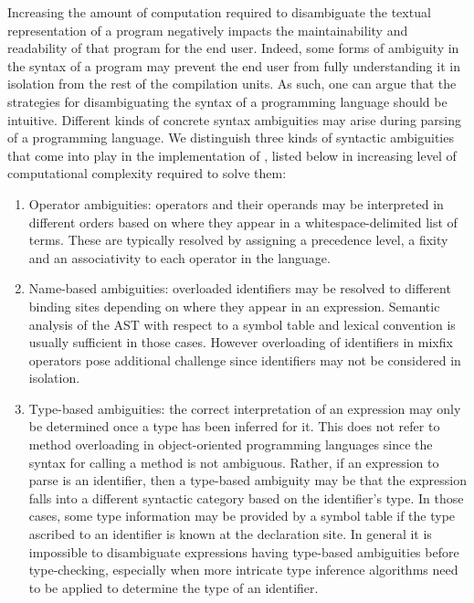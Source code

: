 Increasing the amount of computation required to disambiguate the textual representation of a program negatively impacts the maintainability and readability of that program for the end user.
Indeed, some forms of ambiguity in the syntax of a program may prevent the end user from fully understanding it in isolation from the rest of the compilation units.
As such, one can argue that the strategies for disambiguating the syntax of a programming language should be intuitive.
Different kinds of concrete syntax ambiguities may arise during parsing of a programming language.
We distinguish three kinds of syntactic ambiguities that come into play in the implementation of \Beluga, listed below in increasing level of computational complexity required to solve them:
\begin{enumerate}
\item
Operator ambiguities: operators and their operands may be interpreted in different orders based on where they appear in a whitespace-delimited list of terms.
These are typically resolved by assigning a precedence level, a fixity and an associativity to each operator in the language.
\item
Name-based ambiguities: overloaded identifiers may be resolved to different binding sites depending on where they appear in an expression.
Semantic analysis of the \ac{AST} with respect to a symbol table and lexical convention is usually sufficient in those cases.
However overloading of identifiers in mixfix operators pose additional challenge since identifiers may not be considered in isolation.
\item
Type-based ambiguities: the correct interpretation of an expression may only be determined once a type has been inferred for it.
This does not refer to method overloading in object-oriented programming languages since the syntax for calling a method is not ambiguous.
Rather, if an expression to parse is an identifier, then a type-based ambiguity may be that the expression falls into a different syntactic category based on the identifier's type.
In those cases, some type information may be provided by a symbol table if the type ascribed to an identifier is known at the declaration site.
In general it is impossible to disambiguate expressions having type-based ambiguities before type-checking, especially when more intricate type inference algorithms need to be applied to determine the type of an identifier.
\end{enumerate}


